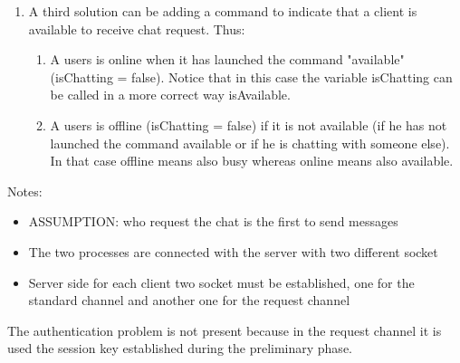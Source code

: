 \documentclass[11pt]{report}
\begin{document}
\begin{enumerate}
	\item A third solution can be adding a command to indicate that a client is available to receive chat request. Thus:
	
	\begin{enumerate}
		\item A users is online when it has launched the command "available" (isChatting = false). Notice that in this case the variable isChatting can be called in a more correct way isAvailable.
		
		\item  A users is offline (isChatting = false) if it is not available (if he has not launched the command available or if he is chatting with someone else). In that case offline means also busy whereas online means also available.
	\end{enumerate}

	
\end{enumerate}

\noindent Notes:

\begin{itemize}
	\item ASSUMPTION: who request the chat is the first to send messages
	\item The two processes are connected with the server with two different socket
	\item Server side for each client two socket must be established, one for the standard channel and another one for the request channel
\end{itemize}

\noindent The authentication problem is not present because in the request channel it is used the session key established during the preliminary phase.
\end{document}
